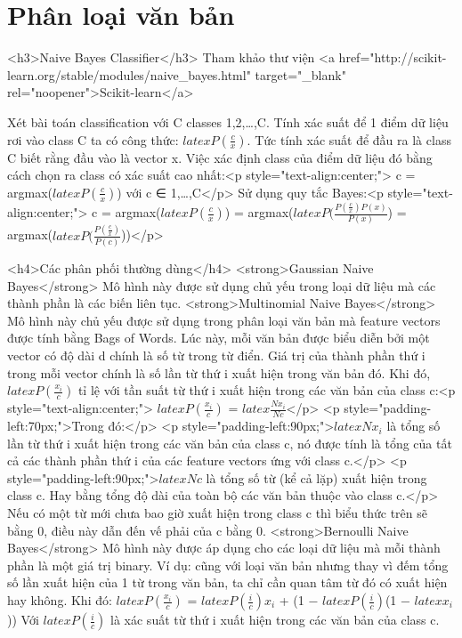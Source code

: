 \chapter{Phân loại văn bản}

<h3>Naive Bayes Classifier</h3>
Tham khảo thư viện <a href="http://scikit-learn.org/stable/modules/naive_bayes.html" target="_blank" rel="noopener">Scikit-learn</a>

Xét bài toán classification với C classes 1,2,…,C. Tính xác suất để 1 điểm dữ liệu rơi vào class C ta có công thức: $latex P(\frac{c}{x})$. Tức tính xác suất để đầu ra là class C biết rằng đầu vào là vector x. Việc xác định class của điểm dữ liệu đó bằng cách chọn ra class có xác suất cao nhất:<p style="text-align:center;">
c = argmax($latex P(\frac{c}{x})$) với c ∈ {1,…,C}</p>
Sử dụng quy tắc Bayes:<p style="text-align:center;">
c = argmax($latex P(\frac{c}{x})$) = argmax($latex P(\frac{P(\frac{c}{x})P(x)}{P(x)}$) = argmax($latex P(\frac{P(\frac{c}{x})}{P(c)}$))</p>

<h4>Các phân phối thường dùng</h4>
<strong>Gaussian Naive Bayes</strong>
Mô hình này được sử dụng chủ yếu trong loại dữ liệu mà các thành phần là các biến liên tục.
<strong>Multinomial Naive Bayes</strong>
Mô hình này chủ yếu được sử dụng trong phân loại văn bản mà feature vectors được tính bằng Bags of Words. Lúc này, mỗi văn bản được biểu diễn bởi một vector có độ dài d chính là số từ trong từ điển. Giá trị của thành phần thứ i trong mỗi vector chính là số lần từ thứ i xuất hiện trong văn bản đó.
Khi đó, $latex P(\frac{x_i}{c})$ tỉ lệ với tần suất từ thứ i xuất hiện trong các văn bản của class c:<p style="text-align:center;"> $latex P(\frac{x_i}{c})$ = $latex \frac{Nx_i}{Nc}$</p>
<p style="padding-left:70px;">Trong đó:</p>
<p style="padding-left:90px;">$latex Nx_i$ là tổng số lần từ thứ i xuất hiện trong các văn bản của class c, nó được tính là tổng của tất cả các thành phần thứ i của các feature vectors ứng với class c.</p>
<p style="padding-left:90px;">$latex Nc$ là tổng số từ (kể cả lặp) xuất hiện trong class c. Hay bằng tổng độ dài của toàn bộ các văn bản thuộc vào class c.</p>
Nếu có một từ mới chưa bao giờ xuất hiện trong class c thì biểu thức trên sẽ bằng 0, điều này dẫn đến vế phải của c bằng 0.
<strong>Bernoulli Naive Bayes</strong>
Mô hình này được áp dụng cho các loại dữ liệu mà mỗi thành phần là một giá trị binary. Ví dụ: cũng với loại văn bản nhưng thay vì đếm tổng số lần xuất hiện của 1 từ trong văn bản, ta chỉ cần quan tâm từ đó có xuất hiện hay không.
Khi đó: $latex P(\frac{x_i}{c})$ = $latex P(\frac{i}{c})x_i$ + (1 − $latex P(\frac{i}{c})$(1 − $latex x_i $))
Với $latex P(\frac{i}{c})$ là xác suất từ thứ i xuất hiện trong các văn bản của class c.